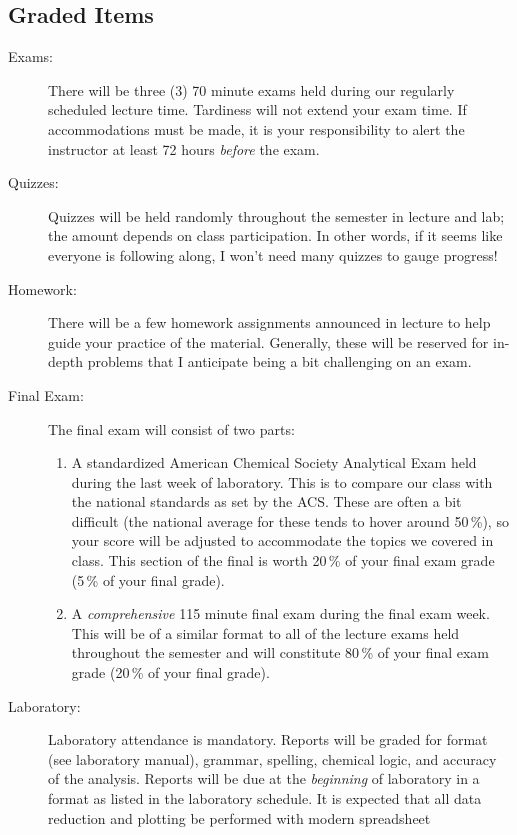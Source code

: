 \documentclass[11pt,letterpaper]{article}
\begin{document}
\subsection{Graded Items}
\begin{description}
	\item[Exams:] There will be three (3) 70 minute exams held during our
		regularly scheduled lecture time. Tardiness will not extend your
		exam time. If accommodations must be made, it is your
		responsibility to alert the instructor at least 72 hours
		\emph{before} the exam.
	\item[Quizzes:] Quizzes will be held randomly throughout the semester
		in lecture and lab; the amount depends on class participation.
		In other words, if it seems like everyone is following along, I
		won't need many quizzes to gauge progress!
	\item[Homework:] There will be a few homework assignments announced in
		lecture to help guide your practice of the material. Generally,
		these will be reserved for in-depth problems that I anticipate
		being a bit challenging on an exam.
	\item[Final Exam:] The final exam will consist of two parts:
		\begin{enumerate}
			\item A standardized American Chemical Society
				Analytical Exam held during the last week of
				laboratory. This is to compare our class with
				the national standards as set by the ACS. These
				are often a bit difficult (the national average
				for these tends to hover around 50\,\%), so your
				score will be adjusted to accommodate the topics
				we covered in class. This section of the final
				is worth 20\,\% of your final exam grade (5\,\%
				of your final grade).
			\item A \emph{comprehensive} 115 minute final exam
				during the final exam week. This will be of a
				similar format to all of the lecture exams held
				throughout the semester and will constitute
				80\,\% of your final exam grade (20\,\% of your
				final grade).
		\end{enumerate}
	\item[Laboratory:] Laboratory attendance is mandatory. Reports will be
		graded for format (see laboratory manual), grammar, spelling,
		chemical logic, and accuracy of the analysis. Reports will be
		due at the \emph{beginning} of laboratory in a format as listed
		in the laboratory schedule.  It is expected that all data
		reduction and plotting be performed with modern spreadsheet

\end{description}
\end{document}
